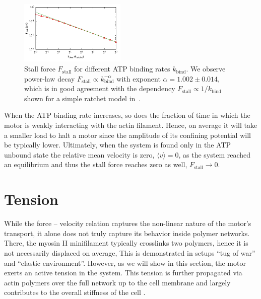 \documentclass[aps,pre,twocolumn,showpacs,showkeys,superscriptaddress,floatfix]{revtex4-1}
\begin{document}
\begin{figure}[t]
\centering
\includegraphics[width=0.45\textwidth,height=!]{k_Fstall}
\caption{
\label{fig:k_Fstall} 
Stall force $F_\text{stall}$ for different ATP binding rates $k_\text{bind}$.
We observe power-law decay $F_\text{stall} \propto k_\text{bind}^{-\alpha}$ with exponent $\alpha = 1.002 \pm 0.014$,
which is in good agreement with the dependency $F_\text{stall} \propto 1 / k_\text{bind}$ shown for a simple ratchet model in~\cite{astumian1996mechanochemical}. 
}
\end{figure}
When the ATP binding rate increases, so does the fraction of time in which the motor is weakly interacting with the actin filament. 
Hence, on average it will take a smaller load to halt a motor since the amplitude of its confining potential will be typically lower.
Ultimately, when the system is found only in the ATP unbound state the relative mean velocity is zero, $\langle v \rangle = 0$, as the system reached an equilibrium 
and thus the stall force reaches zero as well, $F_\text{stall} \to 0$.


\section{Tension}
\label{sec:tension}
While the force -- velocity relation captures the non-linear nature of the motor's transport, 
it alone does not truly capture its behavior inside polymer networks.
There, the myosin II minifilament typically crosslinks two polymers,
hence it is not necessarily displaced on average, 
This is demonstrated in setups ``tug of war'' and ``elastic environment''. 
However, as we will show in this section, the motor exerts an active tension in the system.
This tension is further propagated via actin polymers over the full network up to the cell membrane and largely contributes to the overall stiffness of the cell \cite{chugh2017actin,ma2012nonmuscle,monier2010actomyosin}.
\end{document}

